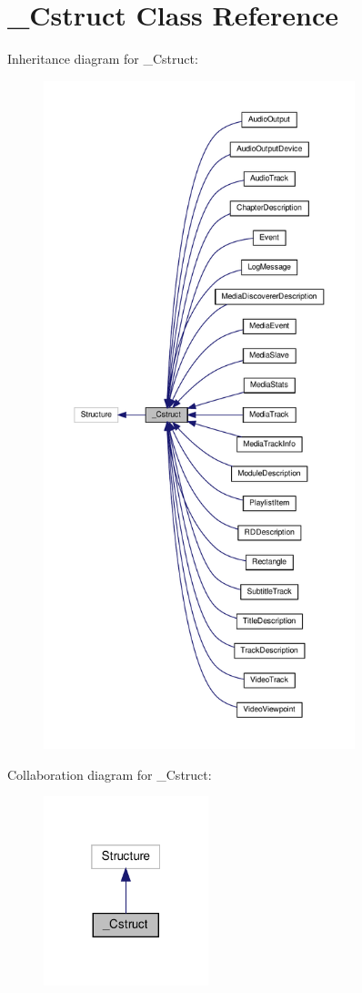 \hypertarget{classvlc_1_1___cstruct}{}\section{\+\_\+\+Cstruct Class Reference}
\label{classvlc_1_1___cstruct}


Inheritance diagram for \+\_\+\+Cstruct\+:
\nopagebreak
\begin{figure}[H]
\begin{center}
\leavevmode
\includegraphics[height=550pt]{classvlc_1_1___cstruct__inherit__graph}
\end{center}
\end{figure}


Collaboration diagram for \+\_\+\+Cstruct\+:
\nopagebreak
\begin{figure}[H]
\begin{center}
\leavevmode
\includegraphics[width=136pt]{classvlc_1_1___cstruct__coll__graph}
\end{center}
\end{figure}
